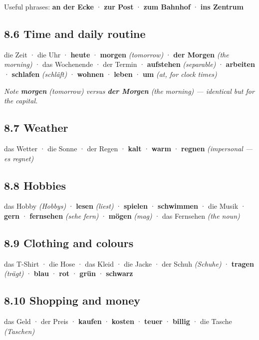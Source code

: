 \documentclass[
  11pt,
]{article}
\begin{document}
Useful phrases: \textbf{an der Ecke} · \textbf{zur Post} · \textbf{zum
Bahnhof} · \textbf{ins Zentrum}

\subsection{8.6 Time and daily routine}\label{time-and-daily-routine}

die Zeit · die Uhr · \textbf{heute} · \textbf{morgen} \emph{(tomorrow)}
· \textbf{der Morgen} \emph{(the morning)} · das Wochenende · der Termin
· \textbf{aufstehen} \emph{(separable)} · \textbf{arbeiten} ·
\textbf{schlafen} \emph{(schläft)} · \textbf{wohnen} · \textbf{leben} ·
\textbf{um} \emph{(at, for clock times)}

\emph{Note \textbf{morgen} (tomorrow) versus \textbf{der Morgen} (the
morning) --- identical but for the capital.}

\subsection{8.7 Weather}\label{weather}

das Wetter · die Sonne · der Regen · \textbf{kalt} · \textbf{warm} ·
\textbf{regnen} \emph{(impersonal --- es regnet)}

\subsection{8.8 Hobbies}\label{hobbies}

das Hobby \emph{(Hobbys)} · \textbf{lesen} \emph{(liest)} ·
\textbf{spielen} · \textbf{schwimmen} · die Musik · \textbf{gern} ·
\textbf{fernsehen} \emph{(sehe fern)} · \textbf{mögen} \emph{(mag)} ·
das Fernsehen \emph{(the noun)}

\subsection{8.9 Clothing and colours}\label{clothing-and-colours}

das T-Shirt · die Hose · das Kleid · die Jacke · der Schuh
\emph{(Schuhe)} · \textbf{tragen} \emph{(trägt)} · \textbf{blau} ·
\textbf{rot} · \textbf{grün} · \textbf{schwarz}

\subsection{8.10 Shopping and money}\label{shopping-and-money}

das Geld · der Preis · \textbf{kaufen} · \textbf{kosten} ·
\textbf{teuer} · \textbf{billig} · die Tasche \emph{(Taschen)}
\end{document}
